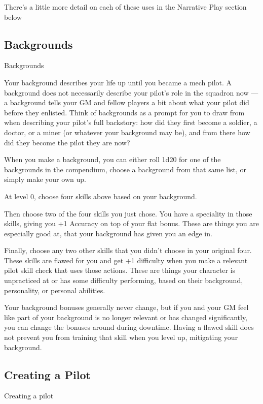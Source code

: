 There’s a little more detail on each of these uses in the Narrative Play section below  

\subsection{Backgrounds}
                                               Backgrounds  

Your background describes your life up until you became a mech pilot. A background does not  
necessarily describe your pilot’s role in the squadron now — a background tells your GM and  
fellow players a bit about what your pilot did before they enlisted. Think of backgrounds as a  
prompt for you to draw from when describing your pilot’s full backstory: how did they first  
become a soldier, a doctor, or a miner (or whatever your background may be), and from there  
how did they become the pilot they are now? 
 

When you make a background, you can either roll 1d20 for one of the backgrounds in the  
compendium, choose a background from that same list, or simply make your own up.
 

At level 0, choose four skills above based on your background. 
 
Then choose two of the four skills you just chose. You have a speciality in those skills, giving  
you +1 Accuracy on top of your flat bonus. These are things you are especially good at, that  
your background has given you an edge in.
 

                                                                                                                 


Finally, choose any two other skills that you didn’t choose in your original four. These skills are  
flawed for you and get +1 difficulty when you make a relevant pilot skill check that uses those  
actions. These are things your character is unpracticed at or has some difficulty performing,  
based on their background, personality, or personal abilities.
 

Your background bonuses generally never change, but if you and your GM feel like part of your  
background is no longer relevant or has changed significantly, you can change the bonuses  
around during downtime. Having a flawed skill does not prevent you from training that skill when  
you level up, mitigating your background.
 
\subsection{Creating a Pilot}
                                              Creating a pilot  

